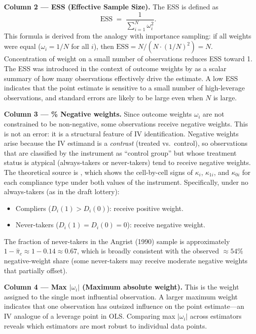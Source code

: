 \documentclass[12pt, a4paper]{article}
\begin{document}
\bigskip
\noindent\textbf{Column 2 --- ESS (Effective Sample Size).}
The ESS is defined as
%
\begin{equation}
  \mathrm{ESS} \;=\; \frac{1}{\displaystyle\sum_{i=1}^{N} \omega_i^2}.
  \label{eq:ess}
\end{equation}
%
This formula is derived from the analogy with importance sampling: if all
weights were equal ($\omega_i = 1/N$ for all $i$), then
$\mathrm{ESS} = N / (N \cdot (1/N)^2) = N$. Concentration of weight on a
small number of observations reduces ESS toward 1. The ESS was introduced
in the context of outcome weights by \citet[][Section~4]{knaus2024outcome}
as a scalar summary of how many observations effectively drive the estimate.
A low ESS indicates that the point estimate is sensitive to a small number
of high-leverage observations, and standard errors are likely to be large
even when $N$ is large.

\bigskip
\noindent\textbf{Column 3 --- \% Negative weights.}
Since outcome weights $\omega_i$ are not constrained to be non-negative,
some observations receive negative weights. This is not an error: it is a
structural feature of IV identification. Negative weights arise because the
IV estimand is a \emph{contrast} (treated vs.\ control), so observations
that are classified by the instrument as ``control group'' but whose
treatment status is atypical (always-takers or never-takers) tend to receive
negative weights. The theoretical source is \citet[][Table~1]{sloczyn2025kappa},
which shows the cell-by-cell signs of $\kappa_i$, $\kappa_{1i}$, and
$\kappa_{0i}$ for each compliance type under both values of the instrument.
Specifically, under no always-takers (as in the draft lottery):
\begin{itemize}
  \item Compliers ($D_i(1)>D_i(0)$): receive positive weight.
  \item Never-takers ($D_i(1)=D_i(0)=0$): receive negative weight.
\end{itemize}
The fraction of never-takers in the Angrist (1990) sample is approximately
$1 - \hat{\pi}_c \approx 1 - 0.14 \approx 0.67$, which is broadly consistent
with the observed $\approx 54$\% negative-weight share (some never-takers may
receive moderate negative weights that partially offset).

\bigskip
\noindent\textbf{Column 4 --- Max $|\omega_i|$ (Maximum absolute weight).}
This is the weight assigned to the single most influential observation. A
larger maximum weight indicates that one observation has outsized influence on
the point estimate---an IV analogue of a leverage point in OLS. Comparing
max $|\omega_i|$ across estimators reveals which estimators are most robust
to individual data points.
\end{document}
